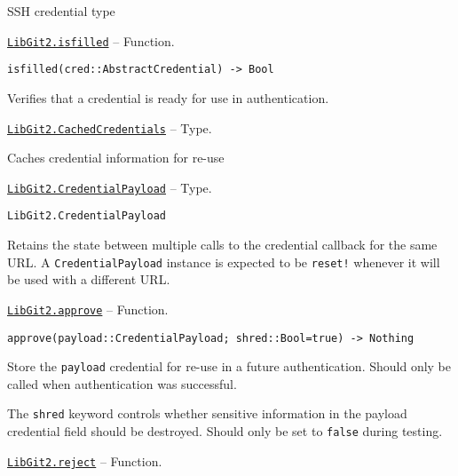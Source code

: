 \begin{adjustwidth}{2em}{0pt}

SSH credential type



\end{adjustwidth}
\hypertarget{10844720204154576193}{}
\hyperlink{10844720204154576193}{\texttt{LibGit2.isfilled}}  -- {Function.}

\begin{adjustwidth}{2em}{0pt}


\begin{verbatim}
isfilled(cred::AbstractCredential) -> Bool
\end{verbatim}

Verifies that a credential is ready for use in authentication.



\end{adjustwidth}
\hypertarget{8879321221473200614}{}
\hyperlink{8879321221473200614}{\texttt{LibGit2.CachedCredentials}}  -- {Type.}

\begin{adjustwidth}{2em}{0pt}

Caches credential information for re-use



\end{adjustwidth}
\hypertarget{10030132349633212983}{}
\hyperlink{10030132349633212983}{\texttt{LibGit2.CredentialPayload}}  -- {Type.}

\begin{adjustwidth}{2em}{0pt}


\begin{verbatim}
LibGit2.CredentialPayload
\end{verbatim}

Retains the state between multiple calls to the credential callback for the same URL. A \texttt{CredentialPayload} instance is expected to be \texttt{reset!} whenever it will be used with a different URL.



\end{adjustwidth}
\hypertarget{15851737231324263444}{}
\hyperlink{15851737231324263444}{\texttt{LibGit2.approve}}  -- {Function.}

\begin{adjustwidth}{2em}{0pt}


\begin{verbatim}
approve(payload::CredentialPayload; shred::Bool=true) -> Nothing
\end{verbatim}

Store the \texttt{payload} credential for re-use in a future authentication. Should only be called when authentication was successful.

The \texttt{shred} keyword controls whether sensitive information in the payload credential field should be destroyed. Should only be set to \texttt{false} during testing.



\end{adjustwidth}
\hypertarget{17184615468062555134}{}
\hyperlink{17184615468062555134}{\texttt{LibGit2.reject}}  -- {Function.}

